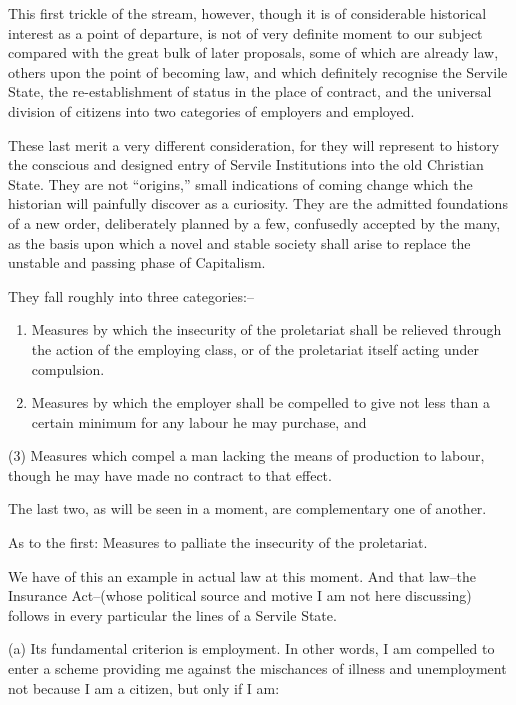 \documentclass{book}
\begin{document}
This first trickle of the stream, however, though it is of considerable historical interest as a point of departure, is not of very definite moment to our subject compared with the great bulk of later proposals, some of which are already law, others upon the point of becoming law, and which definitely recognise the Servile State, the re-establishment of status in the place of contract, and the universal division of citizens into two categories of employers and employed.

These last merit a very different consideration, for they will represent to history the conscious and designed entry of Servile Institutions into the old Christian State. They are not “origins,” small indications of coming change which the historian will painfully discover as a curiosity. They are the admitted foundations of a new order, deliberately planned by a few, confusedly accepted by the many, as the basis upon which a novel and stable society shall arise to replace the unstable and passing phase of Capitalism.

They fall roughly into three categories:–

\begin{enumerate}
\item Measures by which the insecurity of the proletariat shall be relieved through the action of the employing class, or of the proletariat itself acting under compulsion.


\item Measures by which the employer shall be compelled to give not less than a certain minimum for any labour he may purchase, and



\end{enumerate}
(3) Measures which compel a man lacking the means of production to labour, though he may have made no contract to that effect.

The last two, as will be seen in a moment, are complementary one of another.

As to the first: Measures to palliate the insecurity of the proletariat.

We have of this an example in actual law at this moment. And that law–the Insurance Act–(whose political source and motive I am not here discussing) follows in every particular the lines of a Servile State.

(a) Its fundamental criterion is employment. In other words, I am compelled to enter a scheme providing me against the mischances of illness and unemployment not because I am a citizen, but only if I am:
\end{document}
